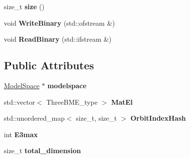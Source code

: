 \begin{DoxyCompactItemize}
\mbox{\label{classThreeBodyME_acb7ea7455c5cb240ef4baf22c23a5834}} 
size\+\_\+t {\bfseries size} ()
\item 
\mbox{\label{classThreeBodyME_a30115e30bd48e9de874033df24203e36}} 
void {\bfseries Write\+Binary} (std\+::ofstream \&)
\item 
\mbox{\label{classThreeBodyME_a10cc65d3be1c15effeff46f163b6db5b}} 
void {\bfseries Read\+Binary} (std\+::ifstream \&)
\end{DoxyCompactItemize}
\subsection*{Public Attributes}
\begin{DoxyCompactItemize}
\item 
\mbox{\label{classThreeBodyME_ac6db5f87e03146d866b1be5d48c2b391}} 
\hyperlink{classModelSpace}{Model\+Space} $\ast$ {\bfseries modelspace}
\item 
\mbox{\label{classThreeBodyME_a2d0f23edcc175927a678c1f80e27be32}} 
std\+::vector$<$ Three\+B\+M\+E\+\_\+type $>$ {\bfseries Mat\+El}
\item 
\mbox{\label{classThreeBodyME_a3b5d0ab1ec432b5b25a57dc7bce9f69c}} 
std\+::unordered\+\_\+map$<$ size\+\_\+t, size\+\_\+t $>$ {\bfseries Orbit\+Index\+Hash}
\item 
\mbox{\label{classThreeBodyME_a7dc605c3634b1346686ab1c89f1d6d81}} 
int {\bfseries E3max}
\item 
\mbox{\label{classThreeBodyME_a97b27671aabccbab071a653ac1112b86}} 
size\+\_\+t {\bfseries total\+\_\+dimension}
\end{DoxyCompactItemize}
